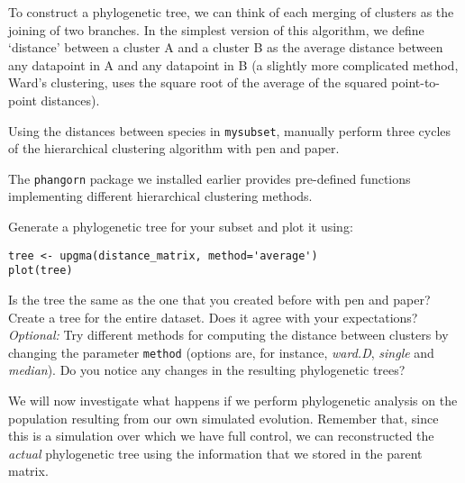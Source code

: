 \documentclass[a4paper, 9pt]{article}
\begin{document}
To construct a phylogenetic tree, we can think of each merging of
clusters as the joining of two branches. In the simplest version of this
algorithm, we define `distance' between a cluster A and a cluster B as
the average distance between any datapoint in A and any datapoint in B
(a slightly more complicated method, Ward's clustering, uses the square
root of the average of the squared point-to-point distances).

\begin{exercise}
    \askstar Using the distances between species in \texttt{mysubset}, manually perform three cycles of the hierarchical clustering algorithm with pen and paper.
\end{exercise}

The \texttt{phangorn} package we installed earlier provides pre-defined
functions implementing different hierarchical clustering methods.

\begin{exercise}
    \action Generate a phylogenetic tree for your subset and plot it using:\begin{lstlisting}
tree <- upgma(distance_matrix, method='average')
plot(tree)\end{lstlisting}
Is the tree the same as the one that you created before with pen and paper?
\action Create a tree for the entire dataset. Does it agree with your expectations?
\action \emph{Optional:} Try different methods for computing the distance between clusters by changing the parameter \texttt{method} (options are, for instance, \textit{ward.D}, \textit{single} and \textit{median}). Do you notice any changes in the resulting phylogenetic trees?
\end{exercise}

We will now investigate what happens if we perform phylogenetic analysis
on the population resulting from our own simulated evolution. Remember
that, since this is a simulation over which we have full control, we can
reconstructed the \emph{actual} phylogenetic tree using the information
that we stored in the parent matrix.
\end{document}
